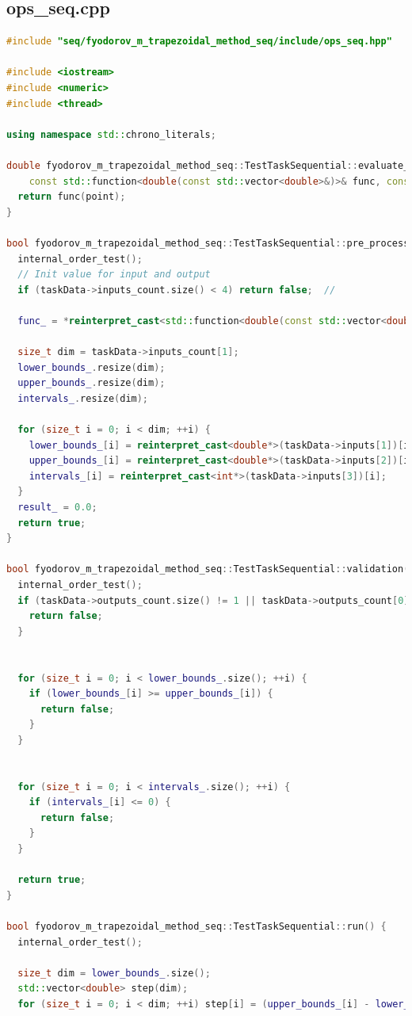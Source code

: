 \documentclass{article}
\begin{document}

\subsection{ops\_seq.cpp}
\begin{lstlisting}[language=C++]
#include "seq/fyodorov_m_trapezoidal_method_seq/include/ops_seq.hpp"

#include <iostream>
#include <numeric>
#include <thread>

using namespace std::chrono_literals;

double fyodorov_m_trapezoidal_method_seq::TestTaskSequential::evaluate_func(
    const std::function<double(const std::vector<double>&)>& func, const std::vector<double>& point) {
  return func(point);
}

bool fyodorov_m_trapezoidal_method_seq::TestTaskSequential::pre_processing() {
  internal_order_test();
  // Init value for input and output
  if (taskData->inputs_count.size() < 4) return false;  //

  func_ = *reinterpret_cast<std::function<double(const std::vector<double>&)>*>(taskData->inputs[0]);

  size_t dim = taskData->inputs_count[1];
  lower_bounds_.resize(dim);
  upper_bounds_.resize(dim);
  intervals_.resize(dim);

  for (size_t i = 0; i < dim; ++i) {
    lower_bounds_[i] = reinterpret_cast<double*>(taskData->inputs[1])[i];
    upper_bounds_[i] = reinterpret_cast<double*>(taskData->inputs[2])[i];
    intervals_[i] = reinterpret_cast<int*>(taskData->inputs[3])[i];
  }
  result_ = 0.0;
  return true;
}

bool fyodorov_m_trapezoidal_method_seq::TestTaskSequential::validation() {
  internal_order_test();
  if (taskData->outputs_count.size() != 1 || taskData->outputs_count[0] != 1) {
    return false;
  }

  
  for (size_t i = 0; i < lower_bounds_.size(); ++i) {
    if (lower_bounds_[i] >= upper_bounds_[i]) {
      return false;
    }
  }

  
  for (size_t i = 0; i < intervals_.size(); ++i) {
    if (intervals_[i] <= 0) {
      return false;
    }
  }

  return true;
}

bool fyodorov_m_trapezoidal_method_seq::TestTaskSequential::run() {
  internal_order_test();

  size_t dim = lower_bounds_.size();
  std::vector<double> step(dim);
  for (size_t i = 0; i < dim; ++i) step[i] = (upper_bounds_[i] - lower_bounds_[i]) / intervals_[i];


\end{lstlisting}
\end{document}
